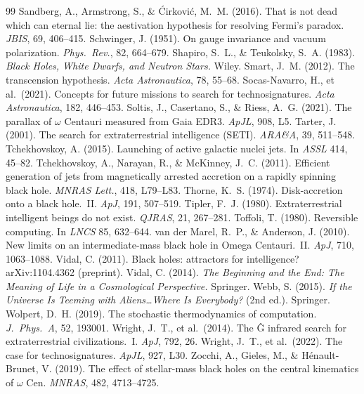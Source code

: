 \documentclass[11pt]{article}
\begin{document}
\begin{thebibliography}{99}
 Sandberg, A., Armstrong, S., \& \'Cirkovi\'c, M.~M. (2016). That is not dead which can eternal lie: the aestivation hypothesis for resolving Fermi's paradox. \emph{JBIS}, 69, 406--415.
 Schwinger, J. (1951). On gauge invariance and vacuum polarization. \emph{Phys.\ Rev.}, 82, 664--679.
 Shapiro, S.~L., \& Teukolsky, S.~A. (1983). \emph{Black Holes, White Dwarfs, and Neutron Stars.} Wiley.
 Smart, J.~M. (2012). The transcension hypothesis. \emph{Acta Astronautica}, 78, 55--68.
 Socas-Navarro, H., et al.\ (2021). Concepts for future missions to search for technosignatures. \emph{Acta Astronautica}, 182, 446--453.
 Soltis, J., Casertano, S., \& Riess, A.~G. (2021). The parallax of $\omega$ Centauri measured from Gaia EDR3. \emph{ApJL}, 908, L5.
 Tarter, J. (2001). The search for extraterrestrial intelligence (SETI). \emph{ARA\&A}, 39, 511--548.
 Tchekhovskoy, A. (2015). Launching of active galactic nuclei jets. In \emph{ASSL} 414, 45--82.
 Tchekhovskoy, A., Narayan, R., \& McKinney, J.~C. (2011). Efficient generation of jets from magnetically arrested accretion on a rapidly spinning black hole. \emph{MNRAS Lett.}, 418, L79--L83.
 Thorne, K.~S. (1974). Disk-accretion onto a black hole.\ II. \emph{ApJ}, 191, 507--519.
 Tipler, F.~J. (1980). Extraterrestrial intelligent beings do not exist. \emph{QJRAS}, 21, 267--281.
 Toffoli, T. (1980). Reversible computing. In \emph{LNCS} 85, 632--644.
 van der Marel, R.~P., \& Anderson, J. (2010). New limits on an intermediate-mass black hole in Omega Centauri.\ II. \emph{ApJ}, 710, 1063--1088.
 Vidal, C. (2011). Black holes: attractors for intelligence? arXiv:1104.4362 (preprint).
 Vidal, C. (2014). \emph{The Beginning and the End: The Meaning of Life in a Cosmological Perspective.} Springer.
 Webb, S. (2015). \emph{If the Universe Is Teeming with Aliens\ldots Where Is Everybody?} (2nd ed.). Springer.
 Wolpert, D.~H. (2019). The stochastic thermodynamics of computation. \emph{J.\ Phys.\ A}, 52, 193001.
 Wright, J.~T., et al.\ (2014). The \^G infrared search for extraterrestrial civilizations.\ I. \emph{ApJ}, 792, 26.
 Wright, J.~T., et al.\ (2022). The case for technosignatures. \emph{ApJL}, 927, L30.
 Zocchi, A., Gieles, M., \& H\'enault-Brunet, V. (2019). The effect of stellar-mass black holes on the central kinematics of $\omega$ Cen. \emph{MNRAS}, 482, 4713--4725.
\end{thebibliography}
\end{document}
